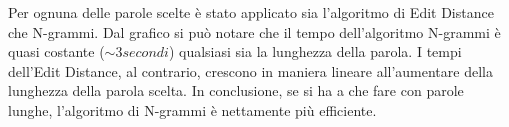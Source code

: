 \documentclass[a4paper,12pt]{article}
\begin{document}
\newline
\newline
Per ognuna delle parole scelte è stato applicato sia l'algoritmo di Edit Distance che N-grammi.
\newline
\newline
Dal grafico si può notare che il tempo dell'algoritmo N-grammi è quasi costante ($\sim 3  secondi$) qualsiasi sia la lunghezza della parola.
\newline
\newline
I tempi dell'Edit Distance, al contrario, crescono in maniera lineare all'aumentare della lunghezza della parola scelta.
\newline
\newline
In conclusione, se si ha a che fare con parole lunghe, l'algoritmo di N-grammi è nettamente più efficiente.

\clearpage
\end{document}
